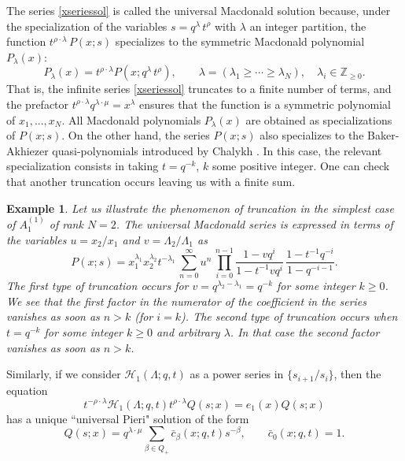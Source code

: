 \documentclass[12pt]{amsart}
\newtheorem{example}[thm]{Example}
\newcommand{\Z}{{\mathbb Z}}
\newcommand{\lL}{{\Lambda}}
\numberwithin{equation}{section}
\begin{document}
The series \eqref{xseriessol} is called the universal Macdonald solution because, under the specialization of the 
variables $s =q^{\lambda}\, t^{\rho} $ with $\lambda$ an integer partition, the function $t^{\rho\cdot \lambda}\,P(x;s)$ specializes to the symmetric Macdonald  polynomial $P_\lambda(x)$:
\begin{equation}\label{specializationA}
P_{\lambda}(x) = t^{\rho\cdot \lambda} P(x;q^\lambda\,t^\rho ),
%
\qquad \lambda=(\lambda_1\geq\cdots\geq\lambda_N),\quad \lambda_i\in \Z_{\geq 0}.
\end{equation}
That is, the infinite series \eqref{xseriessol} truncates to a finite number of terms, and the prefactor $t^{\rho\cdot \lambda} q^{\lambda\cdot \mu}=x^\lambda$ ensures that the function is a symmetric polynomial of $x_1,...,x_N$. 
All Macdonald polynomials $P_\lambda(x)$ are obtained as specializations of $P(x;s)$.
On the other hand, the series $P(x;s)$ also specializes to the Baker-Akhiezer quasi-polynomials introduced by Chalykh \cite{Chalykh}. In this case, the relevant specialization consists in taking $t=q^{-k}$, $k$ some positive integer. One can check that another truncation occurs leaving us with a finite sum.
%
%
%
\begin{example}
Let us illustrate the phenomenon of truncation in the simplest case of $A_1^{(1)}$ of rank $N=2$. The universal Macdonald series is expressed in terms of the 
variables $u=x_2/x_1$ and $v=\lL_2/\lL_1$ as
$$ P(x;s)=x_1^{\lambda_1}x_2^{\lambda_2} t^{-\lambda_1}\, 
\sum_{n=0}^\infty u^n \,\prod_{i=0}^{n-1} \frac{1- v q^i}{1-t^{-1}v q^i}\,\frac{1-t^{-1}q^{-i}}{1-q^{-i-1}}.$$
The first type of truncation occurs for $v=q^{\lambda_2-\lambda_1}=q^{-k}$ for some integer $k\geq 0$. We see that the first factor in the numerator 
of the coefficient in the series vanishes as 
soon as $n>k$ (for $i=k$).  The second type of truncation occurs when $t=q^{-k}$ for some integer $k\geq 0$ 
and arbitrary $\lambda$. In that case the second factor vanishes as soon as $n>k$.
\end{example}

Similarly, if we consider $\mathcal H_1(\Lambda;q,t)$ as a power series in $\{s_{i+1}/s_i\}$, 
then the equation  
\begin{equation}\label{HQ}
t^{-\rho\cdot \lambda}\mathcal H_1(\Lambda;q,t)t^{\rho\cdot \lambda}Q(s;x) = e_1(x) Q(s;x)
\end{equation}
has a unique ``universal Pieri" solution of the form
\begin{equation}\label{Qseries}
Q(s;x)
%
= q^{\lambda\cdot \mu} \sum_{\beta\in Q_+} \bar{c}_\beta(x;q,t) s^{-\beta}, \qquad \bar{c}_0(x;q,t)=1.
\end{equation}
\end{document}
